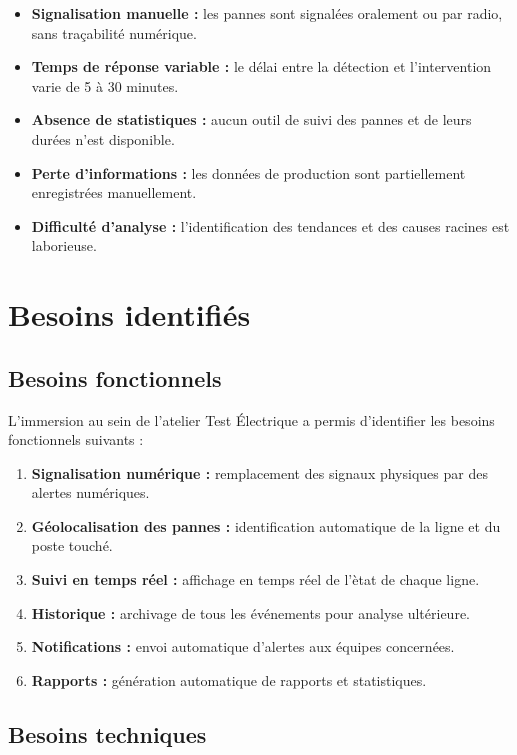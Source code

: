 \begin{itemize}
    \item \textbf{Signalisation manuelle :} les pannes sont signal\'ees oralement ou par radio, sans tra\c{c}abilit\'e num\'erique.
    \item \textbf{Temps de r\'eponse variable :} le d\'elai entre la d\'etection et l'intervention varie de 5 \`a 30 minutes.
    \item \textbf{Absence de statistiques :} aucun outil de suivi des pannes et de leurs dur\'ees n'est disponible.
    \item \textbf{Perte d'informations :} les donn\'ees de production sont partiellement enregistr\'ees manuellement.
    \item \textbf{Difficult\'e d'analyse :} l'identification des tendances et des causes racines est laborieuse.
\end{itemize}

\section{Besoins identifi\'es}

\subsection{Besoins fonctionnels}

L'immersion au sein de l'atelier Test \'Electrique a permis d'identifier les besoins fonctionnels suivants :

\begin{enumerate}
    \item \textbf{Signalisation num\'erique :} remplacement des signaux physiques par des alertes num\'eriques.
    \item \textbf{G\'eolocalisation des pannes :} identification automatique de la ligne et du poste touch\'e.
    \item \textbf{Suivi en temps r\'eel :} affichage en temps r\'eel de l'\`etat de chaque ligne.
    \item \textbf{Historique :} archivage de tous les \'ev\'enements pour analyse ult\'erieure.
    \item \textbf{Notifications :} envoi automatique d'alertes aux \'equipes concern\'ees.
    \item \textbf{Rapports :} g\'en\'eration automatique de rapports et statistiques.
\end{enumerate}

\subsection{Besoins techniques}

